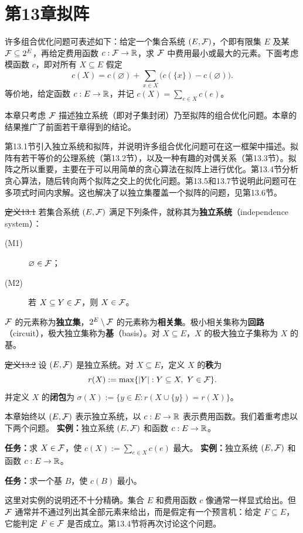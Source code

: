 \section*{第13章\quad 拟阵}
许多组合优化问题可表述如下：给定一个集合系统 $(E,\mathcal F)$，个即有限集 $E$ 及某 $\mathcal F\subseteq2^E$，再给定费用函数 $c:\mathcal F\to\mathbb R$，求 $\mathcal F$ 中费用最小或最大的元素。下面考虑模函数 $c$，即对所有 $X\subseteq E$ 假定
\[c(X)=c(\varnothing)+\sum_{x\in X}\bigl(c(\{x\})-c(\varnothing)\bigr).\]
等价地，给定函数 $c:E\to\mathbb R$，并记 $c(X)=\sum_{e\in X}c(e)$。

本章只考虑 $\mathcal F$ 描述独立系统（即对子集封闭）乃至拟阵的组合优化问题。本章的结果推广了前面若干章得到的结论。

第13.1节引入独立系统和拟阵，并说明许多组合优化问题可在这一框架中描述。拟阵有若干等价的公理系统（第13.2节），以及一种有趣的对偶关系（第13.3节）。拟阵之所以重要，主要在于可以用简单的贪心算法在拟阵上进行优化。第13.4节分析贪心算法，随后转向两个拟阵之交上的优化问题。第13.5和13.7节说明此问题可在多项式时间内求解。这也解决了以独立集覆盖一个拟阵的问题，见第13.6节。

\st{定义13.1} 若集合系统 $(E,\mathcal F)$ 满足下列条件，就称其为\textbf{独立系统}（independence system）：
\begin{description}
\item[(M1)] $\varnothing\in\mathcal F$；
\item[(M2)] 若 $X\subseteq Y\in\mathcal F$，则 $X\in\mathcal F$。
\end{description}
$\mathcal F$ 的元素称为\textbf{独立集}，$2^E\setminus\mathcal F$ 的元素称为\textbf{相关集}。极小相关集称为\textbf{回路}（circuit），极大独立集称为\textbf{基}（basis）。对 $X\subseteq E$，$X$ 的极大独立子集称为 $X$ 的基。

\st{定义13.2} 设 $(E,\mathcal F)$ 是独立系统。对 $X\subseteq E$，定义 $X$ 的\textbf{秩}为
\[r(X):=\max\{|Y|:Y\subseteq X,\ Y\in\mathcal F\}.\]
并定义 $X$ 的\textbf{闭包}为 $\sigma(X):=\{y\in E:r(X\cup\{y\})=r(X)\}$。

本章始终以 $(E,\mathcal F)$ 表示独立系统，以 $c:E\to\mathbb R$ 表示费用函数。我们着重考虑以下两个问题。
\textbf{实例：}独立系统 $(E,\mathcal F)$ 和函数 $c:E\to\mathbb R$。\par
\textbf{任务：}求 $X\in\mathcal F$，使 $c(X):=\sum_{e\in X}c(e)$ 最大。
\textbf{实例：}独立系统 $(E,\mathcal F)$ 和函数 $c:E\to\mathbb R$。\par
\textbf{任务：}求一个基 $B$，使 $c(B)$ 最小。

这里对实例的说明还不十分精确。集合 $E$ 和费用函数 $c$ 像通常一样显式给出。但 $\mathcal F$ 通常并不通过列出其全部元素来给出，而是假定有一个预言机：给定 $F\subseteq E$，它能判定 $F\in\mathcal F$ 是否成立。第13.4节将再次讨论这个问题。

